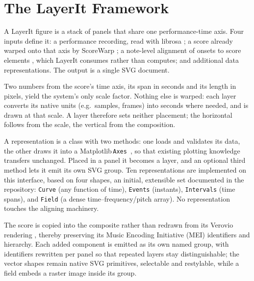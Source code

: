 \documentclass{article}
\begin{document}
\section{The LayerIt Framework}\label{sec:framework}
A LayerIt figure is a stack of panels that share one performance-time axis.
Four inputs define it: a performance recording, read with librosa \cite{mcfee2015LibrosaAudioMusic}; a score already warped onto that axis by ScoreWarp \cite{goebl2025LetsScoreWarpAgain}; a note-level alignment of onsets to score elements \cite{weigl2020MultimodalMusicInformation}, which LayerIt consumes rather than computes; and additional data representations.
The output is a single SVG document.


Two numbers from the score's time axis, its span in seconds and its length in pixels, yield the system's only scale factor. Nothing else is warped: each layer converts its native units (e.g.\ samples, frames) into seconds where needed, and is drawn at that scale. A layer therefore sets neither placement; the horizontal follows from the scale, the vertical from the composition.

A representation is a class with two methods: one loads and validates its data, the other draws it into a Matplotlib\,\texttt{Axes}~\cite{hunter2007Matplotlib2DGraphics}, so that existing plotting knowledge transfers unchanged. Placed in a panel it becomes a layer, and an optional third method lets it emit its own SVG group. Ten representations are implemented on this interface, based on four shapes, an initial, extensible set documented in the repository: \texttt{Curve} (any function of time), \texttt{Events} (instants), \texttt{Intervals} (time spans), and \texttt{Field} (a dense time--frequency/pitch array). No representation touches the aligning machinery.

The score is copied into the composite rather than redrawn from its Verovio rendering \cite{pugin2014VerovioLibraryEngraving}, thereby preserving its Music Encoding Initiative (MEI) identifiers and hierarchy.
Each added component is emitted as its own named group, with identifiers rewritten per panel so that repeated layers stay distinguishable; the vector shapes remain native SVG primitives, selectable and restylable, while a field embeds a raster image inside its group.
\end{document}
